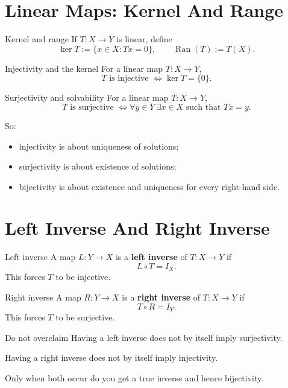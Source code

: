 \documentclass[header={Ancillary Note: Basic Mappings},notheorems]{study-note}
\begin{document}
\section{Linear Maps: Kernel And Range}

\begin{defbox}{Kernel and range}
If $T:X\to Y$ is linear, define
\[
\ker T:=\{x\in X:Tx=0\},
\qquad
\operatorname{Ran}(T):=T(X).
\]
\end{defbox}

\begin{thmbox}{Injectivity and the kernel}
For a linear map $T:X\to Y$,
\[
T \text{ is injective } \Longleftrightarrow \ker T=\{0\}.
\]
\end{thmbox}

\begin{thmbox}{Surjectivity and solvability}
For a linear map $T:X\to Y$,
\[
T \text{ is surjective } \Longleftrightarrow \forall y\in Y\ \exists x\in X\text{ such that }Tx=y.
\]
\end{thmbox}

\begin{focusbox}
So:
\begin{itemize}
\item injectivity is about uniqueness of solutions;
\item surjectivity is about existence of solutions;
\item bijectivity is about existence and uniqueness for every right-hand side.
\end{itemize}
\end{focusbox}

\section{Left Inverse And Right Inverse}

\begin{defbox}{Left inverse}
A map $L:Y\to X$ is a \textbf{left inverse} of $T:X\to Y$ if
\[
L\circ T=I_X.
\]
This forces $T$ to be injective.
\end{defbox}

\begin{defbox}{Right inverse}
A map $R:Y\to X$ is a \textbf{right inverse} of $T:X\to Y$ if
\[
T\circ R=I_Y.
\]
This forces $T$ to be surjective.
\end{defbox}

\begin{warningbox}{Do not overclaim}
Having a left inverse does not by itself imply surjectivity.

Having a right inverse does not by itself imply injectivity.

Only when both occur do you get a true inverse and hence bijectivity.
\end{warningbox}
\end{document}
